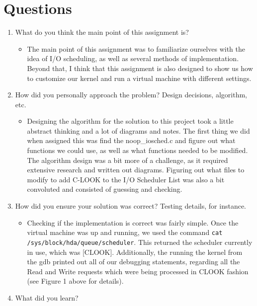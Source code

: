 \documentclass[letterpaper,10pt,onecolumn]{IEEEtran}
\begin{document}
    
    \newpage
   
    \section*{Questions}
    \begin{enumerate}
        \item What do you think the main point of this assignment is?
        \begin{itemize}
            \item The main point of this assignment was to familiarize ourselves with the idea of I/O scheduling, as well as several methods of implementation. Beyond that, I think that this assignment is also designed to show us how to customize our kernel and run a virtual machine with different settings.
        \end{itemize}
        \item How did you personally approach the problem? Design decisions, algorithm, etc.
        \begin{itemize}
            \item Designing the algorithm for the solution to this project took a little abstract thinking and a lot of diagrams and notes. The first thing we did when assigned this was find the noop\_iosched.c and figure out what functions we could use, as well as what functions needed to be modified. The algorithm design was a bit more of a challenge, as it required extensive research and written out diagrams. Figuring out what files to modify to add C-LOOK to the I/O Scheduler List was also a bit convoluted and consisted of guessing and checking.
        \end{itemize}
        \item How did you ensure your solution was correct? Testing details, for instance.
        \begin{itemize}
            \item Checking if the implementation is correct was fairly simple. Once the virtual machine was up and running, we used the command \texttt{cat /sys/block/hda/queue/scheduler}. This returned the scheduler currently in use, which was [CLOOK]. Additionally, the running the kernel from the gdb printed out all of our debugging statements, regarding all the Read and Write requests which were being processed in CLOOK fashion (see Figure 1 above for details). 
        \end{itemize}
        \item What did you learn?
        \begin{itemize}

\end{itemize}
\end{enumerate}
\end{document}

